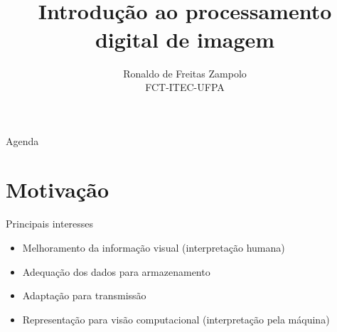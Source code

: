 


\title{\cursogrande\\ \vspace{1cm}Introdução ao processamento digital de imagem}
\author{Ronaldo de Freitas Zampolo\\FCT-ITEC-UFPA}
\date{ }


   \maketitle[randomdots={false}]
   \begin{slide}{Agenda}
      \tableofcontents[content=sections]
   \end{slide}

   \section[ slide = true]{Motivação}
      \begin{slide}[toc=]{Principais interesses}
		\begin{itemize}
		      \item Melhoramento da informação visual (interpretação humana)
		      \item Adequação dos dados para armazenamento
		      \item Adaptação para transmissão
		      \item Representação para visão computacional (interpretação pela máquina)
		\end{itemize}
      \end{slide}


